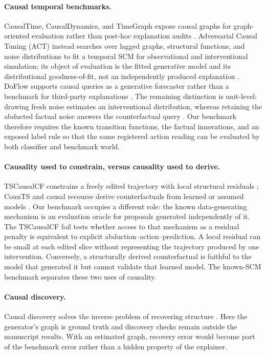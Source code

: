 \documentclass{article}
\begin{document}
\paragraph{Causal temporal benchmarks.}
CausalTime, CausalDynamics, and TimeGraph expose causal graphs for graph-oriented evaluation rather than post-hoc explanation audits \citep{cheng2024causaltime,herdeanu2025causaldynamics,ferdous2025timegraph}.  Adversarial Causal Tuning (ACT) instead searches over lagged graphs, structural functions, and noise distributions to fit a temporal SCM for observational and interventional simulation; its object of evaluation is the fitted generative model and its distributional goodness-of-fit, not an independently produced explanation \citep{gkorgkolis2025act}.  DoFlow supports causal queries as a generative forecaster rather than a benchmark for third-party explanations \citep{doflow2025}.  The remaining distinction is unit-level: drawing fresh noise estimates an interventional distribution, whereas retaining the abducted factual noise answers the counterfactual query \citep{thumm2026interventional,pearl2009causality}.  Our benchmark therefore requires the known transition functions, the factual innovations, and an exposed label rule so that the same registered action reading can be evaluated by both classifier and benchmark world.

\paragraph{Causality used to constrain, versus causality used to derive.}
TSCausalCF constrains a freely edited trajectory with local structural residuals \citep{bahri2025causalfeasibility}; CounTS and causal recourse derive counterfactuals from learned or assumed models \citep{yan2023counts,karimi2021recourse}.  Our benchmark occupies a different role: the known data-generating mechanism is an evaluation oracle for proposals generated independently of it.  The TSCausalCF foil tests whether access to that mechanism as a residual penalty is equivalent to explicit abduction--action--prediction. A local residual can be small at each edited slice without representing the trajectory produced by one intervention.  Conversely, a structurally derived counterfactual is faithful to the model that generated it but cannot validate that learned model.  The known-SCM benchmark separates these two uses of causality.

\paragraph{Causal discovery.}
Causal discovery solves the inverse problem of recovering structure \citep{pamfil2020dynotears,runge2019pcmci,runge2023causal}.  Here the generator's graph is ground truth and discovery checks remain outside the manuscript results.  With an estimated graph, recovery error would become part of the benchmark error rather than a hidden property of the explainer.
\end{document}
